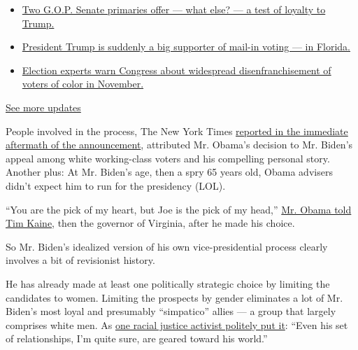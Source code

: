 \begin{itemize}
\tightlist
\item
  \href{https://www.nytimes3xbfgragh.onion/2020/08/04/us/elections/primary-election-michigan-arizona-kansas.html?action=click\&pgtype=Article\&state=default\&region=MAIN_CONTENT_1\&context=storylines_live_updates\#link-3924dd44}{Two
  G.O.P. Senate primaries offer --- what else? --- a test of loyalty to
  Trump.}
\item
  \href{https://www.nytimes3xbfgragh.onion/2020/08/04/us/elections/primary-election-michigan-arizona-kansas.html?action=click\&pgtype=Article\&state=default\&region=MAIN_CONTENT_1\&context=storylines_live_updates\#link-32b39e33}{President
  Trump is suddenly a big supporter of mail-in voting --- in Florida.}
\item
  \href{https://www.nytimes3xbfgragh.onion/2020/08/04/us/elections/primary-election-michigan-arizona-kansas.html?action=click\&pgtype=Article\&state=default\&region=MAIN_CONTENT_1\&context=storylines_live_updates\#link-6d019753}{Election
  experts warn Congress about widespread disenfranchisement of voters of
  color in November.}
\end{itemize}

\href{https://www.nytimes3xbfgragh.onion/2020/08/04/us/elections/primary-election-michigan-arizona-kansas.html?action=click\&pgtype=Article\&state=default\&region=MAIN_CONTENT_1\&context=storylines_live_updates}{See
more updates}

People involved in the process, The New York Times
\href{https://www.nytimes3xbfgragh.onion/2008/08/24/us/politics/24deconstruct.html?_r=1\&hp=\&adxnnl=1\&oref=slogin\&adxnnlx=1219585399-mopoNQ9Taivokt1V0PHsig}{reported
in the immediate aftermath of the announcement}, attributed Mr. Obama's
decision to Mr. Biden's appeal among white working-class voters and his
compelling personal story. Another plus: At Mr. Biden's age, then a spry
65 years old, Obama advisers didn't expect him to run for the presidency
(LOL).

``You are the pick of my heart, but Joe is the pick of my head,''
\href{https://www.nytimes3xbfgragh.onion/2019/08/16/us/politics/biden-obama-history.html}{Mr.
Obama told Tim Kaine}, then the governor of Virginia, after he made his
choice.

So Mr. Biden's idealized version of his own vice-presidential process
clearly involves a bit of revisionist history.

He has already made at least one politically strategic choice by
limiting the candidates to women. Limiting the prospects by gender
eliminates a lot of Mr. Biden's most loyal and presumably ``simpatico''
allies --- a group that largely comprises white men. As
\href{https://www.washingtonpost.com/politics/biden-under-pressure-to-shatter-cement-ceiling-by-naming-a-black-woman-to-be-his-running-mate/2020/07/19/7dfb9dcc-c06f-11ea-9fdd-b7ac6b051dc8_story.html}{one
racial justice activist politely put it}: ``Even his set of
relationships, I'm quite sure, are geared toward his world.''

